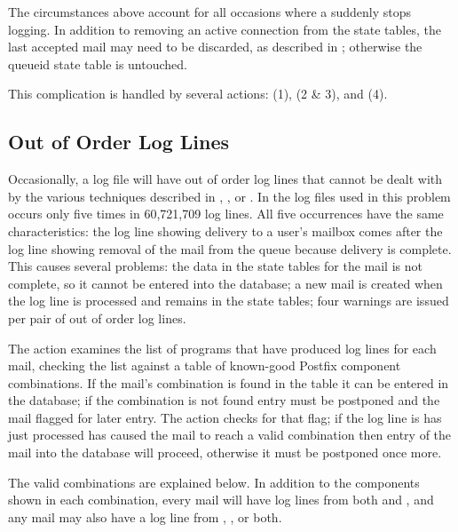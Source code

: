 The circumstances above account for all occasions where a 
suddenly stops logging.  In addition to removing an active connection from
the state tables, the last accepted mail may need to be discarded, as
described in ; otherwise the queueid
state table is untouched.

This complication is handled by several actions:  (1),
 (2 \& 3), and  (4).


\subsection{Out of Order Log Lines}

\label{out of order log lines}

Occasionally, a log file will have out of order log lines that cannot be
dealt with by the various techniques described in , , or
.  In the \numberOFlogFILES{} log
files used in  this problem occurs only five times
in 60,721,709 log lines.  All five occurrences have the same
characteristics: the  log line showing delivery to a user's
mailbox comes after the  log line showing removal of the mail
from the queue because delivery is complete.  This causes several problems:
the data in the state tables for the mail is not complete, so it cannot be
entered into the database; a new mail is created when the 
log line is processed and remains in the state tables; four warnings are
issued per pair of out of order log lines.

The  action examines the list of programs that have produced
log lines for each mail, checking the list against a table of known-good
Postfix component combinations.  If the mail's combination is found in the
table it can be entered in the database; if the combination is not found
entry must be postponed and the mail flagged for later entry.  The
 action checks for that flag; if the log line is
has just processed has caused the mail to reach a valid combination then
entry of the mail into the database will proceed, otherwise it must be
postponed once more.

The valid combinations are explained below.  In addition to the components
shown in each combination, every mail will have log lines from both
 and , and any mail may also have a log line
from , , or both.

